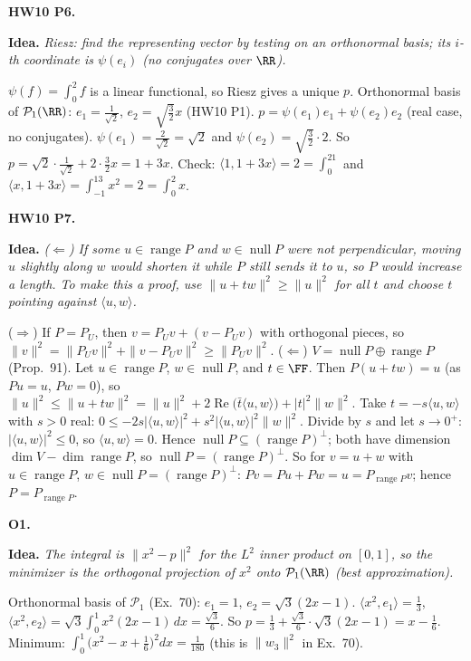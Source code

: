 \documentclass[10pt]{scrartcl}
\DeclareMathOperator{\nul}{null}
\DeclareMathOperator{\range}{range}
\newcommand{\PP}{\mathcal P}
\newcommand{\ip}[2]{\langle #1,#2\rangle}
\newcommand{\idea}[1]{{\color{OliveGreen!75!black}\textbf{Idea.}} \textit{#1}\par}
\newenvironment{prob}{\par\medskip\noindent\begin{minipage}{\linewidth}\setlength{\parskip}{3pt}}{\end{minipage}\par}
\begin{document}
\begin{prob}
\textbf{HW10 P6. }\par 
\idea{Riesz: find the representing vector by testing on an orthonormal basis; its $i$-th coordinate is $\psi(e_i)$ (no conjugates over $\RR$).}$\psi(f)=\int_0^2f$ is a linear functional, so Riesz gives a unique $p$. Orthonormal basis of $\PP_1(\RR)$: $e_1=\frac1{\sqrt2}$, $e_2=\sqrt{\frac32}x$ (HW10 P1). $p=\psi(e_1)e_1+\psi(e_2)e_2$ (real case, no conjugates). $\psi(e_1)=\frac2{\sqrt2}=\sqrt2$ and $\psi(e_2)=\sqrt{\frac32}\cdot2$. So $p=\sqrt2\cdot\frac1{\sqrt2}+2\cdot\frac32x=1+3x$. Check: $\ip1{1+3x}=2=\int_0^21$ and $\ip x{1+3x}=\int_{-1}^13x^2=2=\int_0^2x$.
\end{prob}

\begin{prob}
\textbf{HW10 P7. }\par 
\idea{($\Leftarrow$) If some $u\in\range P$ and $w\in\nul P$ were not perpendicular, moving $u$ slightly along $w$ would shorten it while $P$ still sends it to $u$, so $P$ would increase a length. To make this a proof, use $\|u+tw\|^2\ge\|u\|^2$ for all $t$ and choose $t$ pointing against $\ip uw$.}($\Rightarrow$) If $P=P_U$, then $v=P_Uv+(v-P_Uv)$ with orthogonal pieces, so $\|v\|^2=\|P_Uv\|^2+\|v-P_Uv\|^2\ge\|P_Uv\|^2$.
($\Leftarrow$) $V=\nul P\oplus\range P$ (Prop.~91). Let $u\in\range P$, $w\in\nul P$, and $t\in\FF$. Then $P(u+tw)=u$ (as $Pu=u$, $Pw=0$), so $\|u\|^2\le\|u+tw\|^2=\|u\|^2+2\operatorname{Re}\big(\bar t\ip uw\big)+|t|^2\|w\|^2$. Take $t=-s\ip uw$ with $s>0$ real: $0\le-2s|\ip uw|^2+s^2|\ip uw|^2\|w\|^2$. Divide by $s$ and let $s\to0^+$: $|\ip uw|^2\le0$, so $\ip uw=0$. Hence $\nul P\subseteq(\range P)^\perp$; both have dimension $\dim V-\dim\range P$, so $\nul P=(\range P)^\perp$. So for $v=u+w$ with $u\in\range P$, $w\in\nul P=(\range P)^\perp$: $Pv=Pu+Pw=u=P_{\range P}v$; hence $P=P_{\range P}$.
\end{prob}

\begin{prob}
\textbf{O1. }\par 
\idea{The integral is $\|x^2-p\|^2$ for the $L^2$ inner product on $[0,1]$, so the minimizer is the orthogonal projection of $x^2$ onto $\PP_1(\RR)$ (best approximation).}
Orthonormal basis of $\PP_1$ (Ex.~70): $e_1=1$, $e_2=\sqrt3(2x-1)$. $\ip{x^2}{e_1}=\frac13$, $\ip{x^2}{e_2}=\sqrt3\int_0^1x^2(2x-1)\,dx=\frac{\sqrt3}6$. So $p=\frac13+\frac{\sqrt3}6\cdot\sqrt3(2x-1)=x-\frac16$. Minimum: $\int_0^1\big(x^2-x+\frac16\big)^2dx=\frac1{180}$ (this is $\|w_3\|^2$ in Ex.~70).
\end{prob}
\end{document}
